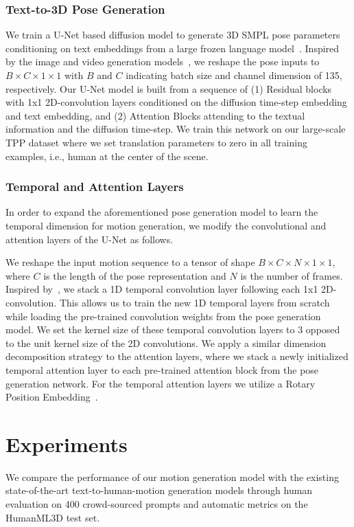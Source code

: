 \documentclass[10pt,twocolumn,letterpaper]{article}
\begin{document}
\subsubsection{Text-to-3D Pose Generation}
We train a U-Net based diffusion model to generate 3D SMPL pose parameters conditioning on text embeddings from a large frozen language model~\cite{t5_2020}. Inspired by the image and video generation models~\cite{MAV}, we reshape the pose inputs to $B\times C\times 1\times 1$ with $B$ and $C$ indicating batch size and channel dimension of 135, respectively. Our U-Net model is built from a sequence of (1) Residual blocks with 1x1 2D-convolution layers conditioned on the diffusion time-step embedding and text embedding, and (2) Attention Blocks attending to the textual information and the diffusion time-step.
We train this network on our large-scale TPP dataset where we set translation parameters to zero in all training examples, i.e., human at the center of the scene. 


\subsubsection{Temporal and Attention Layers}
In order to expand the aforementioned pose generation model to learn the temporal dimension for motion generation, we modify the convolutional and attention layers of the U-Net as follows.

We reshape the input motion sequence to a tensor of shape $B \times C \times N \times 1 \times 1$, where $C$ is the length of the pose representation and $N$ is the number of frames. 
Inspired by~\cite{MAV, ImagenVid}, we stack a 1D temporal convolution layer following each 1x1 2D-convolution. This allows us to train the new 1D temporal layers from scratch while loading the pre-trained convolution weights from the pose generation model. We set the kernel size of these temporal convolution layers to 3 opposed to the unit kernel size of the 2D convolutions. 
We apply a similar dimension decomposition strategy to the attention layers, where we stack a newly initialized temporal attention layer to each pre-trained attention block from the pose generation network. For the temporal attention layers we utilize a Rotary Position Embedding~\cite{roformer}.



\section{Experiments}
We compare the performance of our motion generation model with
the existing state-of-the-art text-to-human-motion generation models through human evaluation on 400 crowd-sourced prompts and automatic metrics on the HumanML3D test set. 
\end{document}
